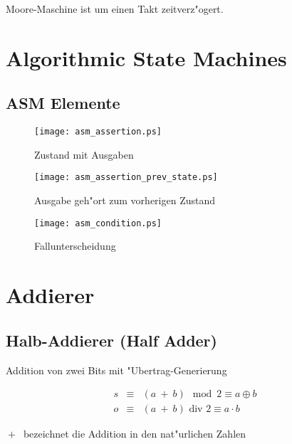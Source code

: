 \documentclass[german, 10pt, a4paper, twocolumn]{scrartcl}
\theoremstyle{definition}
\begin{document}
Moore-Maschine ist um einen Takt zeitverz"ogert.


\section{Algorithmic State Machines}

\subsection{ASM Elemente}

\begin{figure}[htb]
	\begin{center}
		\texttt{[image: asm\_assertion.ps]}
	\end{center}
	\caption{Zustand mit Ausgaben}
\end{figure}

\begin{figure}[htb]
	\begin{center}
		\texttt{[image: asm\_assertion\_prev\_state.ps]}
	\end{center}
	\caption{Ausgabe geh"ort zum vorherigen Zustand}
\end{figure}

\begin{figure}[htb]
	\begin{center}
		\texttt{[image: asm\_condition.ps]}
	\end{center}
	\caption{Fallunterscheidung}
\end{figure}


\section{Addierer}

\subsection{Halb-Addierer (Half Adder)}

Addition von zwei Bits mit "Ubertrag-Generierung

\begin{eqnarray*}
	s &	\equiv &	(a\ \boxed{+} \ b) \mod 2 \equiv a \oplus b \\
	o &	\equiv &	(a\ \boxed{+} \ b) \mbox{ div } 2 \equiv a \cdotp b
\end{eqnarray*}

$\boxed{+} \ $ bezeichnet die Addition in den nat"urlichen Zahlen
\end{document}
